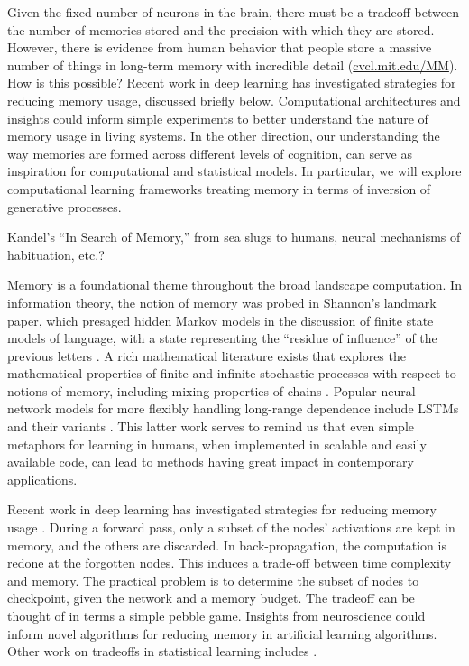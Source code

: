 
\label{sec:aim4}

Given the fixed number of neurons in the brain, there must be a
tradeoff between the number of memories stored and the precision with
which they are stored. However, there is evidence from human behavior
that people store a massive number of things in long-term memory with
incredible detail
(\href{http://cvcl.mit.edu/MM/download.html}{cvcl.mit.edu/MM}). How is
this possible? Recent work in deep learning has investigated
strategies for reducing memory usage, discussed briefly below.
Computational
architectures and insights could inform simple experiments to better
understand the nature of memory usage in living systems.
In the other direction, our understanding the way memories are
formed across different levels of cognition, can serve as
inspiration for computational and statistical models. In particular,
we will explore computational learning frameworks treating memory
in terms of inversion of generative processes.

\biobackground{}
Kandel's ``In Search of Memory,'' from sea slugs to humans,
neural mechanisms of habituation, etc.?

\statbackground{} Memory is a foundational theme throughout the broad
landscape computation. In information theory, the notion of memory was
probed in Shannon's landmark paper, which presaged hidden Markov
models in the discussion of finite state models of language, with a
state representing the ``residue of influence'' of the previous
letters \citep{Shannon:48}. A rich mathematical literature exists that
explores the mathematical properties of finite and infinite stochastic
processes with respect to notions of memory, including mixing
properties of chains \citep{pollard84}. Popular neural network models
for more flexibly handling long-range dependence include LSTMs and
their variants \citep{sepp97,gers00}. This latter work serves to
remind us that even simple metaphors for learning in humans, when
implemented in scalable and easily available code, can lead to methods
having great impact in contemporary applications.

Recent work in deep learning has investigated
strategies for reducing memory usage \citep{ChenXZG16}. During a
forward pass, only a subset of the nodes' activations are kept in
memory, and the others are discarded. In back-propagation, the
computation is redone at the forgotten nodes. This induces a trade-off
between time complexity and memory. The practical problem is to
determine the subset of nodes to checkpoint, given the network and a
memory budget. The tradeoff can be thought of in terms a simple pebble
game. Insights from neuroscience could inform novel algorithms for
reducing memory in artificial learning algorithms. Other
work on tradeoffs in statistical learning includes
\citep{lucic15tradeoffs}.


